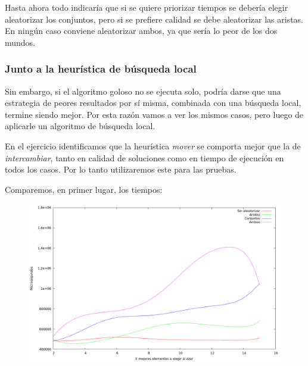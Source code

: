 Hasta ahora todo indicaría que si se quiere priorizar tiempos se debería elegir
aleatorizar los conjuntos, pero si se prefiere calidad se debe aleatorizar las
aristas. En ningún caso conviene aleatorizar ambos, ya que sería lo peor de los
dos mundos.

\newpage \subsubsection{Junto a la heurística de búsqueda local}

Sin embargo, si el algoritmo goloso no se ejecuta solo, podría darse que una
estrategia de peores resultados por sí misma, combinada con una búsqueda local,
termine siendo mejor. Por esta razón vamos a ver los mismos casos, pero luego
de aplicarle un algoritmo de búsqueda local.

En el ejercicio identificamos que la heurística \textit{mover} se comporta
mejor que la de \textit{intercambiar}, tanto en calidad de soluciones como en
tiempo de ejecución en todos los casos. Por lo tanto utilizaremos este para las
pruebas.

Comparemos, en primer lugar, los tiempos:

\begin{figure}[H]
  \begin{center}
    \includegraphics[scale=0.35]{imagenes/grasp-local-x-tiempo.png}
  \end{center}
\end{figure}

